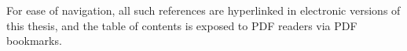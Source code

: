 For ease of navigation, all such references are hyperlinked in electronic
versions of this thesis, and the table of contents is exposed to PDF readers via
PDF bookmarks.








